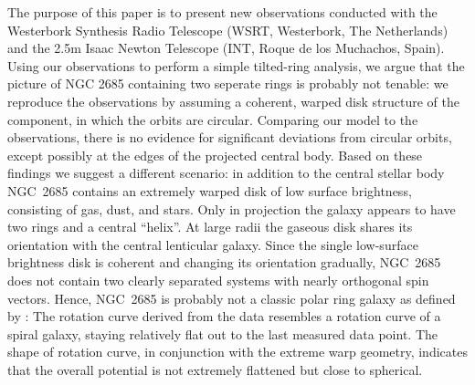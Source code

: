 \documentclass[oldversion]{aa}
\begin{document}
The purpose of this paper is to present new observations conducted
with the Westerbork Synthesis Radio Telescope (WSRT, Westerbork, The
Netherlands) and the 2.5m Isaac Newton Telescope (INT, Roque de los
Muchachos, Spain). Using our  observations to perform a
simple tilted-ring analysis, we argue that the picture of NGC 2685
containing two seperate  rings is probably not tenable: we
reproduce the  observations by assuming a coherent, warped
disk structure of the  component, in which the orbits are
circular. Comparing our model to the observations, there is no
evidence for significant deviations from circular orbits, except
possibly at the edges of the projected central body. Based on these
findings we suggest a different scenario: in addition to the central
stellar body NGC~2685 contains an extremely warped disk of low surface
brightness, consisting of gas, dust, and stars.  Only in projection
the galaxy appears to have two rings and a central ``helix''. At large
radii the gaseous disk shares its orientation with the central
lenticular galaxy. Since the single low-surface brightness disk is
coherent and changing its orientation gradually, NGC~2685 does not
contain two clearly separated systems with nearly orthogonal spin
vectors. Hence, NGC~2685 is probably not a classic polar ring galaxy
as defined by \citet[][ a polar ring galaxy contains two rotating
sub-systems, a disk and a ring or an additional disk, of comparable
sizes with orthogonal angular momentum vectors of similar amplitude;
both systems share the centre and the systemic velocity and the ring
is nearly planar.]{Whitmore90}: The rotation curve derived from the
 data resembles a rotation curve of a spiral galaxy, staying
relatively flat out to the last measured data point. The shape of
rotation curve, in conjunction with the extreme warp geometry,
indicates that the overall potential is not extremely flattened but
close to spherical.
%
%
\end{document}
